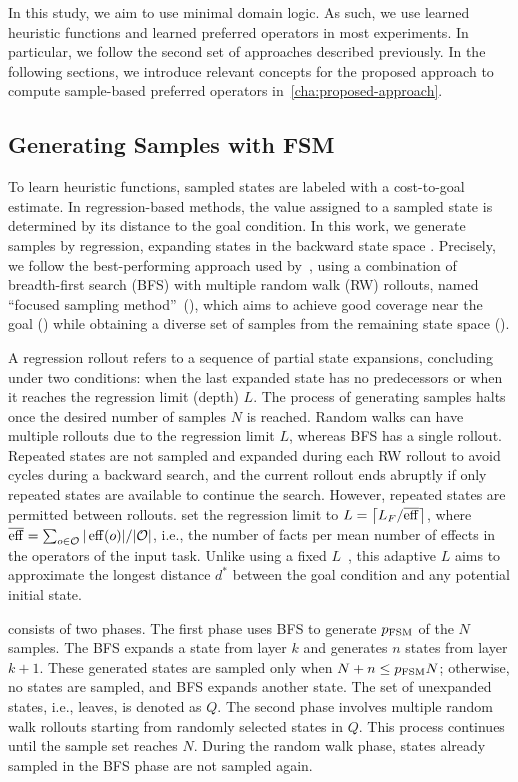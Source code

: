 \documentclass[ppgc,diss,english]{iiufrgs}
\providecommand{\ceil}[1]{\ensuremath{\left\lceil #1\right\rceil}}
\begin{document}
In this study, we aim to use minimal domain logic. As such, we use learned heuristic functions and learned preferred operators in most experiments. In particular, we follow the second set of approaches described previously. In the following sections, we introduce relevant concepts for the proposed approach to compute sample-based preferred operators in~\cref{cha:proposed-approach}.


\subsection{Generating Samples with FSM}
\label{sec:sample-learn-h}
To learn heuristic functions, sampled states are labeled with a cost-to-goal estimate. In regression-based methods, the value assigned to a sampled state is determined by its distance to the goal condition. In this work, we generate samples by regression, expanding states in the backward state space \bsp. Precisely, we follow the best-performing approach used by~\citet{Bettker.etal/2022}, using a combination of breadth-first search (BFS) with multiple random walk (RW) rollouts, named ``focused sampling method''~(\bfsrw), which aims to achieve good coverage near the goal (\bfs) while obtaining a diverse set of samples from the remaining state space (\rw).

A regression rollout refers to a sequence of partial state expansions, concluding under two conditions: when the last expanded state has no predecessors or when it reaches the regression limit (depth) $L$. The process of generating samples halts once the desired number of samples $N$ is reached. Random walks can have multiple rollouts due to the regression limit $L$, whereas BFS has a single rollout. Repeated states are not sampled and expanded during each RW rollout to avoid cycles during a backward search, and the current rollout ends abruptly if only repeated states are available to continue the search. However, repeated states are permitted between rollouts.
\citet{Bettker.etal/2022} set the regression limit to $L=\ceil{\facts/\overline{\eff}}$, where $\overline{\operatorname{eff}}=\sum_{o\in \mathcal{O}} |\operatorname{eff}(o)|/|\mathcal{O}|$, i.e., the number of facts per mean number of effects in the operators of the input task. Unlike using a fixed $L$~\cite{Yu.etal/2020, OToole/2022}, this adaptive $L$ aims to approximate the longest distance $d^{*}$ between the goal condition and any potential initial state.

\bfsrw consists of two phases. The first phase uses BFS to generate $p_\text{FSM}$ of the $N$ samples. The BFS expands a state from layer $k$ and generates $n$ states from layer $k+1$. These generated states are sampled only when $N + n \leq p_{\text{FSM}}N$; otherwise, no states are sampled, and BFS expands another state. The set of unexpanded states, i.e., leaves, is denoted as $Q$. The second phase involves multiple random walk rollouts starting from randomly selected states in $Q$. This process continues until the sample set reaches $N$. During the random walk phase, states already sampled in the BFS phase are not sampled again.
\end{document}

